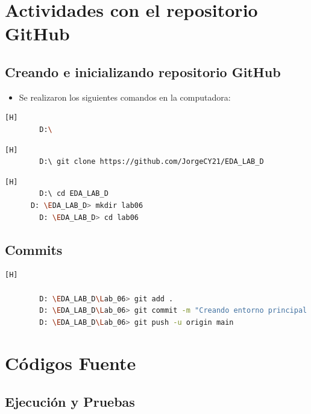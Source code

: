 \documentclass{article}
\begin{document}
	\section{Actividades con el repositorio GitHub}
	
	\subsection{Creando e inicializando repositorio GitHub}
	\begin{itemize}
		\item Se realizaron los siguientes comandos en la computadora:
	\end{itemize}	
		
	\begin{lstlisting}[language=bash,caption={Dirijíéndonos al directorio de trabajo}][H]
		D:\
	\end{lstlisting}	
	\begin{lstlisting}[language=bash,caption={Clonando repositorio GitHub}][H]
		D:\ git clone https://github.com/JorgeCY21/EDA_LAB_D
	\end{lstlisting}
	\begin{lstlisting}[language=bash,caption={Inicializando directorio para laboratorio 06}][H]
		D:\ cd EDA_LAB_D
      D: \EDA_LAB_D> mkdir lab06
		D: \EDA_LAB_D> cd lab06
	\end{lstlisting}
	
	\subsection{Commits}
	\begin{lstlisting}[language=bash,caption={Commit: Creamos el trie principal}][H]
		
		D: \EDA_LAB_D\Lab_06> git add .
		D: \EDA_LAB_D\Lab_06> git commit -m "Creando entorno principal de trie"	
		D: \EDA_LAB_D\Lab_06> git push -u origin main
	\end{lstlisting}
 
	
	\section{Códigos Fuente}	
		

	
\subsection{Ejecución y Pruebas}	


	\clearpage
	
\end{document}
